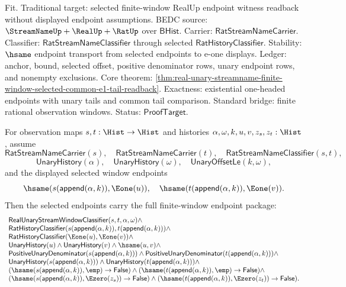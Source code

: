 Fit. Traditional target: selected finite-window RealUp endpoint witness
readback without displayed endpoint assumptions. BEDC source:
$\StreamNameUp+\RealUp+\RatUp$ over $\mathsf{BHist}$. Carrier:
$\mathsf{RatStreamNameCarrier}$. Classifier:
$\mathsf{RatStreamNameClassifier}$ through selected
$\mathsf{RatHistoryClassifier}$. Stability: $\hsame$ endpoint transport from
selected endpoints to e-one displays. Ledger: anchor, bound, selected offset,
positive denominator rows, unary endpoint rows, and nonempty exclusions. Core
theorem:
\autoref{thm:real-unary-streamname-finite-window-selected-common-e1-tail-readback}.
Exactness: existential one-headed endpoints with unary tails and common tail
comparison. Standard bridge: finite rational observation windows. Status:
$\mathsf{ProofTarget}$.

\begin{theorem}
\label{thm:real-unary-streamname-finite-window-selected-full-endpoint-package}
For observation maps $s,t:\Hist\to\Hist$ and histories
$\alpha,\omega,k,u,v,z_s,z_t:\Hist$, assume
$$
\mathsf{RatStreamNameCarrier}(s),\quad
\mathsf{RatStreamNameCarrier}(t),\quad
\mathsf{RatStreamNameClassifier}(s,t),
$$
$$
\mathsf{UnaryHistory}(\alpha),\quad
\mathsf{UnaryHistory}(\omega),\quad
\mathsf{UnaryOffsetLe}(k,\omega),
$$
and the displayed selected window endpoints
$$
\hsame(s(\mathsf{append}(\alpha,k)),\Eone(u)),
\quad
\hsame(t(\mathsf{append}(\alpha,k)),\Eone(v)).
$$
Then the selected endpoints carry the full finite-window endpoint package:
$$
\begin{array}{l}
\mathsf{RealUnaryStreamWindowClassifier}(s,t,\alpha,\omega)\land\\
\mathsf{RatHistoryClassifier}(s(\mathsf{append}(\alpha,k)),t(\mathsf{append}(\alpha,k)))\land\\
\mathsf{RatHistoryClassifier}(\Eone(u),\Eone(v))\land\\
\mathsf{UnaryHistory}(u)\land\mathsf{UnaryHistory}(v)\land\hsame(u,v)\land\\
\mathsf{PositiveUnaryDenominator}(s(\mathsf{append}(\alpha,k)))\land
\mathsf{PositiveUnaryDenominator}(t(\mathsf{append}(\alpha,k)))\land\\
\mathsf{UnaryHistory}(s(\mathsf{append}(\alpha,k)))\land
\mathsf{UnaryHistory}(t(\mathsf{append}(\alpha,k)))\land\\
(\hsame(s(\mathsf{append}(\alpha,k)),\emp)\to\mathsf{False})\land
(\hsame(t(\mathsf{append}(\alpha,k)),\emp)\to\mathsf{False})\land\\
(\hsame(s(\mathsf{append}(\alpha,k)),\Ezero(z_s))\to\mathsf{False})\land
(\hsame(t(\mathsf{append}(\alpha,k)),\Ezero(z_t))\to\mathsf{False}).
\end{array}
$$
\end{theorem}

